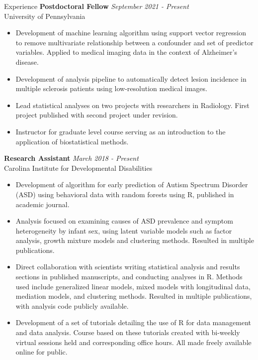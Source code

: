 \documentclass{resume} %
\begin{document}
\begin{rSection}{Experience}
{\bf Postdoctoral Fellow} \hfill {\em September 2021 - Present}
\\ University of Pennsylvania
\begin{itemize}
    \item Development of machine learning algorithm using support vector regression to remove multivariate relationship between a confounder and set of predictor variables.  Applied to medical imaging data in the context of Alzheimer's disease.
    \item Development of analysis pipeline to automatically detect lesion incidence in multiple sclerosis patients using low-resolution medical images.  
    \item Lead statistical analyses on two projects with researchers in Radiology.  First project published with second project under revision.
    \item Instructor for graduate level course serving as an introduction to the application of biostatistical methods.
\end{itemize}
{\bf Research Assistant} \hfill {\em March 2018 - Present}
\\ Carolina Institute for Developmental Disabilities
\begin{itemize}
    \item Development of algorithm for early prediction of Autism Spectrum Disorder (ASD) using behavioral data with random forests using R, published in academic journal.
    \item Analysis focused on examining causes of ASD prevalence and symptom heterogeneity by infant sex, using latent variable models such as factor analysis, growth mixture models and clustering methods.  Resulted in multiple publications.
    \item Direct collaboration with scientists writing statistical analysis and results sections in published manuscripts, and conducting analyses in R.  Methods used include generalized linear models, mixed models with longitudinal data, mediation models, and clustering methods.  Resulted in multiple publications, with analysis code publicly available.
    \item Development of a set of tutorials detailing the use of R for data management and data analysis.  Course based on these tutorials created with bi-weekly virtual sessions held and corresponding office hours.  All made freely available online for public.

\end{itemize}
\end{rSection}
\end{document}
